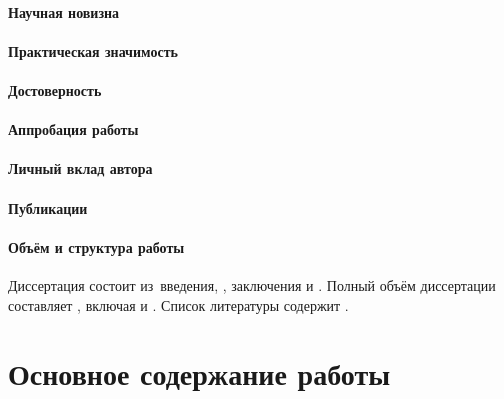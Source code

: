 \paragraph*{Научная новизна}
\paragraph*{Практическая значимость}
\paragraph*{Достоверность}
\paragraph*{Аппробация работы}
\paragraph*{Личный вклад автора}
\paragraph*{Публикации}
\paragraph*{Объём и структура работы}
Диссертация состоит из~введения,
,
заключения и
.
%
Полный объём диссертации составляет
, включая
 и
.
Список литературы содержит
.


\newpage
\section*{Основное содержание работы}

